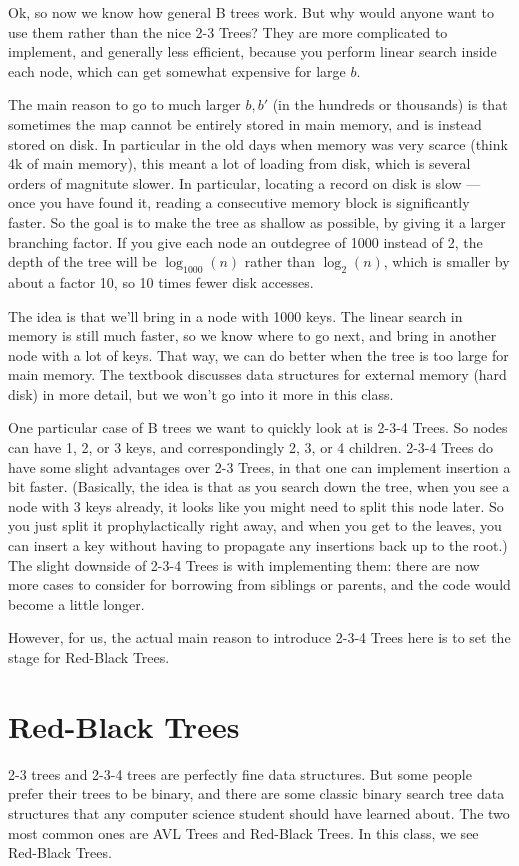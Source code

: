 Ok, so now we know how general B trees work. But why would anyone want
to use them rather than the nice 2-3 Trees? They are more complicated
to implement, and generally less efficient, because you perform linear
search inside each node, which can get somewhat expensive for large
$b$.

The main reason to go to much larger $b,b'$ (in the hundreds or thousands)
is that sometimes the map cannot be entirely stored in main memory,
and is instead stored on disk. In particular in the old days when
memory was very scarce (think 4k of main memory), this meant a lot of
loading from disk, which is several orders of magnitute slower.
In particular, locating a record on disk is slow --- once you have
found it, reading a consecutive memory block is significantly faster.
So the goal is to make the tree as shallow as possible, by giving it a
larger branching factor. If you give each node an outdegree of 1000
instead of 2, the depth of the tree will be $\log_{1000} (n)$ rather
than $\log_2 (n)$, which is smaller by about a factor 10, so 10 times
fewer disk accesses.

The idea is that we'll bring in a node with 1000 keys. The linear
search in memory is still much faster, so we know where to go next,
and bring in another node with a lot of keys. That way, we can do
better when the tree is too large for main memory.
The textbook discusses data structures for external memory (hard disk)
in more detail, but we won't go into it more in this class.

One particular case of B trees we want to quickly look at is 2-3-4
Trees. So nodes can have 1, 2, or 3 keys, and correspondingly 2, 3, or
4 children. 
2-3-4 Trees do have some slight advantages over 2-3 Trees, in that one
can implement insertion a bit faster. 
(Basically, the idea is that as you search down the tree, when you see
a node with 3 keys already, it looks like you might need to split this
node later. So you just split it prophylactically right away, and
when you get to the leaves, you can insert a key without having to
propagate any insertions back up to the root.)
The slight downside of 2-3-4 Trees is with implementing them: there
are now more cases to consider for borrowing from siblings or
parents, and the code would become a little longer. 

However, for us, the actual main reason to introduce 2-3-4 Trees here
is to set the stage for Red-Black Trees.

\section{Red-Black Trees}
2-3 trees and 2-3-4 trees are perfectly fine data structures.
But some people prefer their trees to be binary, and there are some
classic binary search tree data structures that any computer science
student should have learned about. The two most common ones are AVL
Trees and Red-Black Trees. In this class, we see Red-Black Trees.

